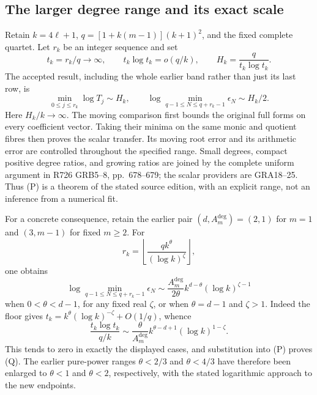 \subsection{The larger degree range and its exact scale}
Retain \(k=4\ell+1\), \(q=[1+k(m-1)](k+1)^2\), and the fixed
complete quartet. Let \(r_k\) be an integer sequence and set
\[
 t_k=r_k/q\longrightarrow\infty,
 \qquad t_k\log t_k=o(q/k),
 \qquad H_k=\frac{q}{t_k\log t_k}.
\]
The accepted result, including the whole earlier band rather than just
its last row, is
\[
 \min_{0\le j\le r_k}\log T_j\sim H_k,
 \qquad
 \log\min_{q-1\le N\le q+r_k-1}\epsilon_N\sim H_k/2.
\tag{P}
\]
Here \(H_k/k\to\infty\). The moving comparison first bounds the
original full forms on every coefficient vector. Taking their minima
on the same monic and quotient fibres then proves the scalar transfer.
Its moving root error and its arithmetic error are controlled throughout
the specified range. Small degrees, compact positive degree ratios, and
growing ratios are joined by the complete uniform argument in R726
GRB5--8, pp.~678--679; the scalar providers are GRA18--25.
Thus (P) is a theorem of the stated source edition, with an explicit
range, not an inference from a numerical fit.

For a concrete consequence, retain the earlier pair
\((d,A_m^{\deg})=(2,1)\) for \(m=1\) and \((3,m-1)\) for fixed
\(m\ge2\). For
\[
 r_k=\left\lfloor\frac{qk^\theta}{(\log k)^\zeta}\right\rfloor,
\]
one obtains
\[
 \log\min_{q-1\le N\le q+r_k-1}\epsilon_N
 \sim\frac{A_m^{\deg}}{2\theta}
      k^{d-\theta}(\log k)^{\zeta-1}
\tag{Q}
\]
when \(0<\theta<d-1\), for any fixed real \(\zeta\), or when
\(\theta=d-1\) and \(\zeta>1\).
Indeed the floor gives
\(t_k=k^\theta(\log k)^{-\zeta}+O(1/q)\), whence
\[
 \frac{t_k\log t_k}{q/k}
 \sim\frac{\theta}{A_m^{\deg}}
       k^{\theta-d+1}(\log k)^{1-\zeta}.
\]
This tends to zero in exactly the displayed cases, and substitution
into (P) proves (Q). The earlier pure-power ranges \(\theta<2/3\)
and \(\theta<4/3\) have therefore been enlarged to \(\theta<1\)
and \(\theta<2\), respectively, with the stated logarithmic
approach to the new endpoints.

